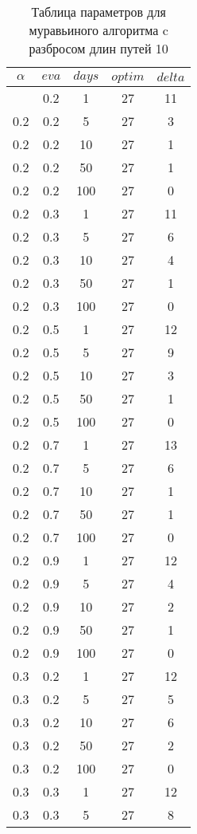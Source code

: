 \begin{appendices}
	\begin{longtable}{|c|c|c|c|c|}
		\caption{Таблица параметров для муравьиного алгоритма c разбросом длин путей 10}\label{t:params_3}\\
		\hline
		$\alpha$ & $eva$ & $days$ & $optim$ & $delta$ \\ \hline
		\endhead
		\endfoot
		0.2 & 0.2 & 1   & 27 & 11 \\
		0.2 & 0.2 & 5   & 27 & 3  \\
		0.2 & 0.2 & 10  & 27 & 1  \\
		0.2 & 0.2 & 50  & 27 & 1  \\
		0.2 & 0.2 & 100 & 27 & 0  \\ \hline
		0.2 & 0.3 & 1   & 27 & 11 \\
		0.2 & 0.3 & 5   & 27 & 6  \\
		0.2 & 0.3 & 10  & 27 & 4  \\
		0.2 & 0.3 & 50  & 27 & 1  \\
		0.2 & 0.3 & 100 & 27 & 0  \\ \hline
		0.2 & 0.5 & 1   & 27 & 12 \\
		0.2 & 0.5 & 5   & 27 & 9  \\
		0.2 & 0.5 & 10  & 27 & 3  \\
		0.2 & 0.5 & 50  & 27 & 1  \\
		0.2 & 0.5 & 100 & 27 & 0  \\ \hline
		0.2 & 0.7 & 1   & 27 & 13 \\
		0.2 & 0.7 & 5   & 27 & 6  \\
		0.2 & 0.7 & 10  & 27 & 1  \\
		0.2 & 0.7 & 50  & 27 & 1  \\
		0.2 & 0.7 & 100 & 27 & 0  \\ \hline
		0.2 & 0.9 & 1   & 27 & 12 \\
		0.2 & 0.9 & 5   & 27 & 4  \\
		0.2 & 0.9 & 10  & 27 & 2  \\
		0.2 & 0.9 & 50  & 27 & 1  \\
		0.2 & 0.9 & 100 & 27 & 0  \\ \hline
		0.3 & 0.2 & 1   & 27 & 12 \\
		0.3 & 0.2 & 5   & 27 & 5  \\
		0.3 & 0.2 & 10  & 27 & 6  \\
		0.3 & 0.2 & 50  & 27 & 2  \\
		0.3 & 0.2 & 100 & 27 & 0  \\ \hline
		0.3 & 0.3 & 1   & 27 & 12 \\
		0.3 & 0.3 & 5   & 27 & 8  \\

\end{longtable}
\end{appendices}
